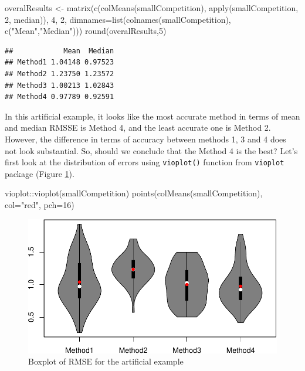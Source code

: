 \documentclass[
]{book}
\newenvironment{Shaded}{\begin{snugshade}}{\end{snugshade}}
\newcommand{\AttributeTok}[1]{\textcolor[rgb]{0.77,0.63,0.00}{#1}}
\newcommand{\DecValTok}[1]{\textcolor[rgb]{0.00,0.00,0.81}{#1}}
\newcommand{\FunctionTok}[1]{\textcolor[rgb]{0.00,0.00,0.00}{#1}}
\newcommand{\NormalTok}[1]{#1}
\newcommand{\OtherTok}[1]{\textcolor[rgb]{0.56,0.35,0.01}{#1}}
\newcommand{\SpecialCharTok}[1]{\textcolor[rgb]{0.00,0.00,0.00}{#1}}
\newcommand{\StringTok}[1]{\textcolor[rgb]{0.31,0.60,0.02}{#1}}
\theoremstyle{definition}
\theoremstyle{definition}
\theoremstyle{definition}
\theoremstyle{definition}
\theoremstyle{remark}
\begin{document}
\begin{Shaded}
\begin{Highlighting}[]
\NormalTok{overalResults }\OtherTok{\textless{}{-}} \FunctionTok{matrix}\NormalTok{(}\FunctionTok{c}\NormalTok{(}\FunctionTok{colMeans}\NormalTok{(smallCompetition), }
                          \FunctionTok{apply}\NormalTok{(smallCompetition, }\DecValTok{2}\NormalTok{, median)),}
                        \DecValTok{4}\NormalTok{, }\DecValTok{2}\NormalTok{, }\AttributeTok{dimnames=}\FunctionTok{list}\NormalTok{(}\FunctionTok{colnames}\NormalTok{(smallCompetition),}
                                            \FunctionTok{c}\NormalTok{(}\StringTok{"Mean"}\NormalTok{,}\StringTok{"Median"}\NormalTok{)))}
\FunctionTok{round}\NormalTok{(overalResults,}\DecValTok{5}\NormalTok{)}
\end{Highlighting}
\end{Shaded}

\begin{verbatim}
##            Mean  Median
## Method1 1.04148 0.97523
## Method2 1.23750 1.23572
## Method3 1.00213 1.02843
## Method4 0.97789 0.92591
\end{verbatim}

In this artificial example, it looks like the most accurate method in terms of mean and median RMSSE is Method 4, and the least accurate one is Method 2. However, the difference in terms of accuracy between methods 1, 3 and 4 does not look substantial. So, should we conclude that the Method 4 is the best? Let's first look at the distribution of errors using \texttt{vioplot()} function from \texttt{vioplot} package (Figure \ref{fig:smallCompetitionBoxplot}).

\begin{Shaded}
\begin{Highlighting}[]
\NormalTok{vioplot}\SpecialCharTok{::}\FunctionTok{vioplot}\NormalTok{(smallCompetition)}
\FunctionTok{points}\NormalTok{(}\FunctionTok{colMeans}\NormalTok{(smallCompetition), }\AttributeTok{col=}\StringTok{"red"}\NormalTok{, }\AttributeTok{pch=}\DecValTok{16}\NormalTok{)}
\end{Highlighting}
\end{Shaded}

\begin{figure}
\centering
\includegraphics{adam_files/figure-latex/smallCompetitionBoxplot-1.pdf}
\caption{\label{fig:smallCompetitionBoxplot}Boxplot of RMSE for the artificial example}
\end{figure}
\end{document}
